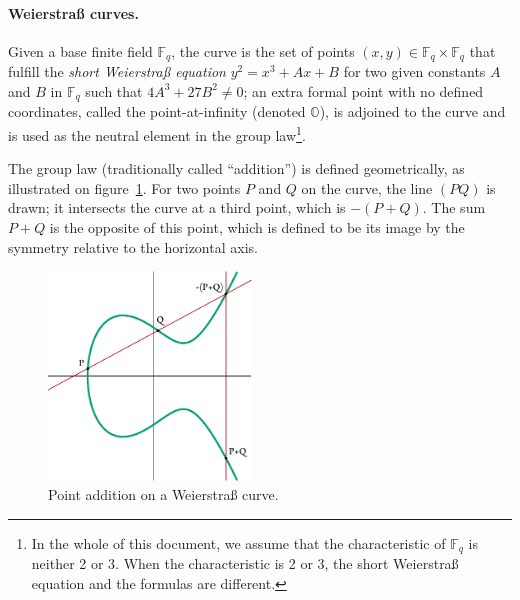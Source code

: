 \documentclass{llncs}
\newcommand{\bF}{\mathbb{F}}
\newcommand{\neutral}{\mathbb{O}}
\begin{document}
\paragraph{Weierstraß curves.} Given a base finite field $\bF_q$, the
curve is the set of points $(x, y) \in \bF_q\times\bF_q$ that fulfill
the \emph{short Weierstraß equation} $y^2 = x^3 + Ax + B$ for two given
constants $A$ and $B$ in $\bF_q$ such that $4A^3 + 27B^2 \neq 0$; an
extra formal point with no defined coordinates, called the
point-at-infinity (denoted $\neutral$), is adjoined to the curve and is
used as the neutral element in the group law\footnote{In the whole of
this document, we assume that the characteristic of $\bF_q$ is neither 2
or 3. When the characteristic is 2 or 3, the short Weierstraß equation
and the formulas are different.}.

The group law (traditionally called ``addition'') is defined
geometrically, as illustrated on figure~\ref{fig:curve1-add}. For two
points $P$ and $Q$ on the curve, the line $(PQ)$ is drawn; it intersects
the curve at a third point, which is $-(P+Q)$. The sum $P+Q$ is the
opposite of this point, which is defined to be its image by the symmetry
relative to the horizontal axis.

\begin{figure}
\begin{center}
    \includegraphics[width=0.48\textwidth]{curve1-add.pdf}
\end{center}
\caption{\label{fig:curve1-add}Point addition on a Weierstraß curve.}
\end{figure}
\end{document}
